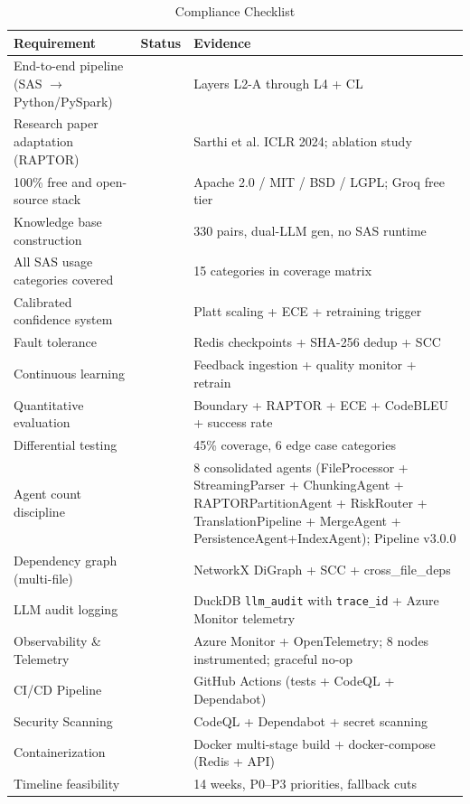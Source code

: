 \documentclass[11pt,a4paper]{article}
\newcommand{\cmark}{\textcolor{successgreen}{\ding{51}}}
\begin{document}
\begin{table}[H]
\centering
\caption{Compliance Checklist}
\renewcommand{\arraystretch}{1.3}
\begin{tabularx}{\textwidth}{@{} X c l @{}}
\toprule
\textbf{Requirement} & \textbf{Status} & \textbf{Evidence} \\
\midrule
End-to-end pipeline (SAS $\to$ Python/PySpark) & \cmark & Layers L2-A through L4 + CL \\
Research paper adaptation (RAPTOR) & \cmark & Sarthi et al. ICLR 2024; ablation study \\
100\% free and open-source stack & \cmark & Apache 2.0 / MIT / BSD / LGPL; Groq free tier \\
Knowledge base construction & \cmark & 330 pairs, dual-LLM gen, no SAS runtime \\
All SAS usage categories covered & \cmark & 15 categories in coverage matrix \\
Calibrated confidence system & \cmark & Platt scaling + ECE + retraining trigger \\
Fault tolerance & \cmark & Redis checkpoints + SHA-256 dedup + SCC \\
Continuous learning & \cmark & Feedback ingestion + quality monitor + retrain \\
Quantitative evaluation & \cmark & Boundary + RAPTOR + ECE + CodeBLEU + success rate \\
Differential testing & \cmark & 45\% coverage, 6 edge case categories \\
Agent count discipline & \cmark & 8 consolidated agents (FileProcessor + StreamingParser + ChunkingAgent + RAPTORPartitionAgent + RiskRouter + TranslationPipeline + MergeAgent + PersistenceAgent+IndexAgent); Pipeline v3.0.0 \\
Dependency graph (multi-file) & \cmark & NetworkX DiGraph + SCC + cross\_file\_deps \\
LLM audit logging & \cmark & DuckDB \texttt{llm\_audit} with \texttt{trace\_id} + Azure Monitor telemetry \\
Observability \& Telemetry & \cmark & Azure Monitor + OpenTelemetry; 8 nodes instrumented; graceful no-op \\
CI/CD Pipeline & \cmark & GitHub Actions (tests + CodeQL + Dependabot) \\
Security Scanning & \cmark & CodeQL + Dependabot + secret scanning \\
Containerization & \cmark & Docker multi-stage build + docker-compose (Redis + API) \\
Timeline feasibility & \cmark & 14 weeks, P0–P3 priorities, fallback cuts \\
\bottomrule
\end{tabularx}
\end{table}
\end{document}
